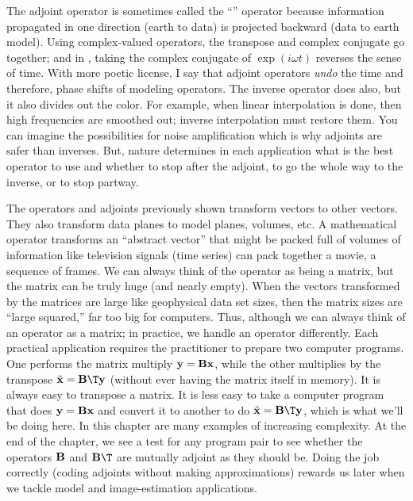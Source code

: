 \par
The adjoint operator is sometimes called
the ``'' operator
because information propagated in one direction (earth to data) is projected
backward (data to earth model).
Using complex-valued operators,
the transpose and complex conjugate go together;
and in , taking the complex conjugate
of $\exp(i\omega t)$ reverses the sense of time.
With more poetic license, I say that adjoint operators
{\em  undo}
the time and therefore, phase shifts of modeling operators.
The inverse operator does also,
but it also divides out the color.
For example, when linear interpolation is done,
then high frequencies are smoothed out; inverse interpolation must restore them.
You can imagine the possibilities for noise amplification
which is why adjoints are safer than inverses.
But, nature determines in each application what is the best operator to use
and whether to stop after the adjoint,
to go the whole way to the inverse,
or to stop partway.

\par 
The operators and adjoints previously shown transform vectors to other vectors.
They also transform data planes to model planes, volumes, etc.
A mathematical operator transforms an ``abstract vector'' that
might be packed full of volumes of information like television
signals (time series) can pack together a movie, a sequence of frames.
We can always think of the operator as being a matrix,
but the matrix can be truly huge (and nearly empty).
When the vectors transformed by the matrices are large like
geophysical data set sizes,
then the matrix sizes are ``large squared,''
far too big for computers.
Thus,
although we can always think of an operator as a matrix;
in practice, we handle an operator differently.
Each practical application requires the practitioner to
prepare two computer programs.
One performs the matrix multiply
$\bold y =\bold B \bold x$,
while the other multiplies by the transpose
$\tilde{\bold x} =\bold B\T \bold y$
(without ever having the matrix itself in memory).
It is always easy to transpose a matrix.
It is less easy to take a computer program that does
$\bold y =\bold B \bold x$
and convert it to another to do
$\tilde{\bold x} =\bold B\T \bold y$,
which is what we'll be doing here.
In this chapter are many examples of increasing complexity.
At the end of the chapter, we see a test for any program pair
to see whether the operators $\bold B$ and $\bold B\T$ are mutually adjoint
as they should be.
Doing the job correctly (coding adjoints without making approximations)
rewards us later when we tackle model and image-estimation applications.

